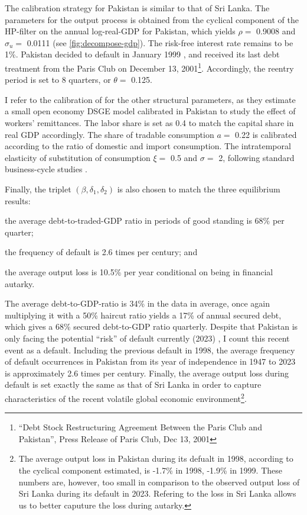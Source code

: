 The calibration strategy for Pakistan is similar to that of Sri Lanka.
The parameters for the output process is obtained from the cyclical component of the HP-filter on the annual log-real-GDP for Pakistan, which yields $\rho = $ 0.9008 and $\sigma_u=$ 0.0111 (see \autoref{fig:decompose-gdp}).
The risk-free interest rate remains to be 1\%.
Pakistan decided to default in January 1999 \citep{pakistan-default-start}, and received its last debt treatment from the Paris Club on December 13, 2001\footnote{``Debt Stock Restructuring Agreement Between
the Paris Club and Pakistan'', Press Release of Paris Club, Dec 13, 2001}.
Accordingly, the reentry period is set to 8 quarters, or $\theta=$ 0.125.

I refer to the calibration of \citet{Pakistan-DSGE-calibration} for the other structural parameters, as they estimate a small open economy DSGE model calibrated in Pakistan to study the effect of workers' remittances.
The labor share is set as 0.4 to match the capital share in real GDP accordingly. The share of tradable consumption $a=$ 0.22 is calibrated according to the ratio of domestic and import consumption. The intratemporal elasticity of substitution of consumption $\xi=$ 0.5 and $\sigma=$ 2, following standard business-cycle studies \citep{Pakistan-DSGE-calibration,Uribe-Schmitt-Grohe-textbook}.


Finally, the triplet $\left( \beta, \delta_1, \delta_2 \right)$ is also chosen to match the three equilibrium results:
\begin{enumerate*}[label = (\roman*)]
    \item the average debt-to-traded-GDP ratio in periods of good standing is 68\% per quarter;
    \item the frequency of default is 2.6 times per century; and
    \item the average output loss is 10.5\% per year conditional on being in financial autarky.
\end{enumerate*}
The average debt-to-GDP-ratio is 34\% in the data in average, once again multiplying it with a 50\% haircut ratio yields a 17\% of annual secured debt, which gives a 68\% secured debt-to-GDP ratio quarterly.
Despite that Pakistan is only facing the potential ``risk'' of default currently (2023)\footnotemark{}
, I count this recent event as a default.
Including the previous default in 1998, the average frequency of default occurrences in Pakistan from its year of independence in 1947 to 2023 is approximately 2.6 times per century\footnotemark{}.
Finally, the average output loss during default is set exactly the same as that of Sri Lanka in order to capture characteristics of the recent volatile global economic environment\footnote{The average output loss in Pakistan during its defualt in 1998, according to the cyclical component estimated, is -1.7\% in 1998, -1.9\% in 1999. These numbers are, however, too small in comparison to the observed output loss of Sri Lanka during its default in 2023. Refering to the loss in Sri Lanka allows us to better caputure the loss during autarky.}.
